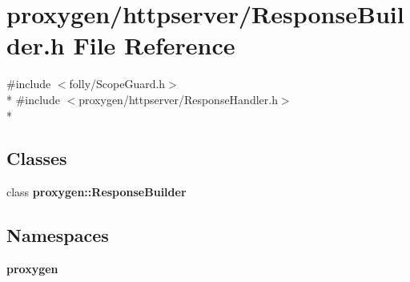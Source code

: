 \section{proxygen/httpserver/\+Response\+Builder.h File Reference}
\label{ResponseBuilder_8h}
{\ttfamily \#include $<$folly/\+Scope\+Guard.\+h$>$}\\*
{\ttfamily \#include $<$proxygen/httpserver/\+Response\+Handler.\+h$>$}\\*
\subsection*{Classes}
\begin{DoxyCompactItemize}
\item 
class {\bf proxygen\+::\+Response\+Builder}
\end{DoxyCompactItemize}
\subsection*{Namespaces}
\begin{DoxyCompactItemize}
\item 
 {\bf proxygen}
\end{DoxyCompactItemize}
